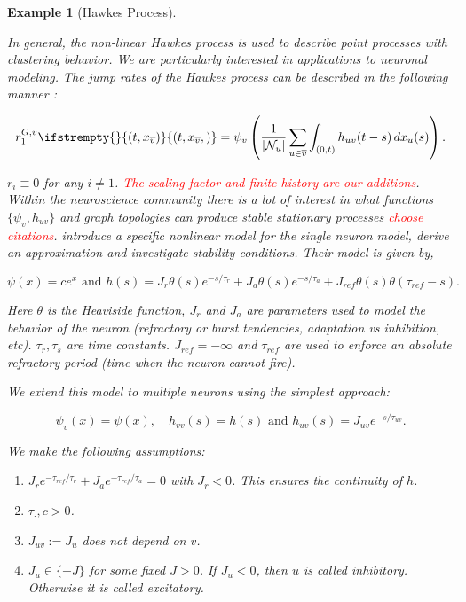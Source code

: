 \documentclass[12pt]{article}
\newcommand{\mc}{\mathcal}
\newcommand{\ov}{\overline}
\newcommand{\te}{\text}
\newcommand{\tr}{\textcolor{red}}
\newcommand{\ind}{\hspace{24pt}}
\newcommand{\neigh}[1]{\mc{N}_{#1}}				%
\newcommand{\cl}[1]{\ov{#1}}						%
\newcommand{\rate}{r}								%
\newcommand{\xf}{x}									%
\newcommand{\vind}[1]{_{#1}}						%
\newcommand{\stpara}[1]{_{#1}}						%
\newcommand{\gvpara}[2]{^{#1,#2}}					%
\newcommand{\tmepro}[3]{
\ifstrempty{#3}{
	\left(#1,#2\right)}{
	\left(#1,#2,#3\right)}}							%
\newtheorem{example}[thms]{Example}
\begin{document}
\begin{example}[Hawkes Process]
\label{ex::Hawkes}

In general, the non-linear Hawkes process is used to describe point processes with clustering behavior. We are particularly interested in applications to neuronal modeling. The jump rates of the Hawkes process can be described in the following manner \cite{BreMas96}:

\[\rate\stpara{1}\gvpara{G}{v}\tmepro{t}{\xf\vind{\cl{v}}}{} = \psi_v\left(\frac{1}{|\neigh{u}|}\sum_{u \in \cl{v}}\int_{(0,t)}  h_{uv}(t-s)\,d\xf\vind{u}(s)\right).\]

\(\rate\stpara{i} \equiv 0\) for any \(i \neq 1\). \tr{The scaling factor and finite history are our additions}. Within the neuroscience community there is a lot of interest in what functions \(\{\psi_v,h_{uv}\}\) and graph topologies can produce stable stationary processes \tr{choose citations}. \cite{GerDegTru17} introduce a specific nonlinear model for the single neuron model, derive an approximation and investigate stability conditions. Their model is given by,

\[\psi(x) = ce^x\te{ and } h(s) = J_r\theta(s)e^{-s/\tau_r} + J_a\theta(s)e^{-s/\tau_a} + J_{ref}\theta(s)\theta(\tau_{ref}-s).\]

Here \(\theta\) is the Heaviside function, \(J_r\) and \(J_a\) are parameters used to model the behavior of the neuron (refractory or burst tendencies, adaptation vs inhibition, etc). \(\tau_r,\tau_s\) are time constants. \(J_{ref} = -\infty\) and \(\tau_{ref}\) are used to enforce an absolute refractory period (time when the neuron cannot fire).

\ind We extend this model to multiple neurons using the simplest approach:

\[\psi_v(x) = \psi(x),\quad h_{vv}(s) = h(s) \te{ and } h_{uv}(s) = J_{uv}e^{-s/\tau_{uv}}.\]

We make the following assumptions:

\begin{enumerate}
\item \(J_re^{-\tau_{ref}/\tau_r} + J_ae^{-\tau_{ref}/\tau_a} = 0\) with \(J_r < 0\). This ensures the continuity of \(h\). 

\item \(\tau_{\cdot},c > 0\).

\item \(J_{uv} := J_u\) does not depend on \(v\).

\item \(J_u \in \{\pm J\}\) for some fixed \(J > 0\). If \(J_u < 0\), then \(u\) is called inhibitory. Otherwise it is called excitatory.


\end{enumerate}
\end{example}
\end{document}
